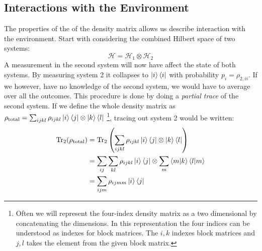\subsection{Interactions with the Environment}\label{sec:density_with_env}
The properties of the of the density matrix allows us describe interaction with the environment. Start with considering the combined Hilbert space of two systems:
\begin{equation}
    \mathcal{H} = \mathcal{H}_1 \otimes \mathcal{H}_2
\end{equation}
A measurement in the second system will now have affect the state of both systems. By measuring system 2 it collapses to $\ket{i}\bra{i}$ with probability $p_i = \rho_{2, ii}$. If we however, have no knowledge of the second system, we would have to average over all the outcomes. This procedure is done by doing a \textit{partial trace} of the second system. If we define the whole density matrix as $\rho_{\text{total}} = \sum_{ijkl}\rho_{ijkl}\ket{i}\bra{j}\otimes\ket{k}\bra{l}$ \footnote{Often we will represent the four-index density matrix as a two dimensional by concatenating the dimensions. In this representation the four indices can be understood as indexes for block matrices. The $i, k$ indexes block matrices and $j, l$ takes the element from the given block matrix.}, tracing out system 2 would be written:
\begin{align}
    \Tr_2 (\rho_{\text{total}})   &= \Tr_2 \left(\sum_{ijkl} \rho_{ijkl} \ket{i}\bra{j} \otimes \ket{k}\bra{l}\right) \nonumber \\
                                    &= \sum_{ij}\sum_{kl} \rho_{ijkl} \ket{i}\bra{j} \otimes \sum_m \bra{m}  \ket{k}\bra{l}\ket{m} \nonumber \\
    &= \sum_{ijm} \rho_{ijmm} \ket{i}\bra{j}
\end{align}
